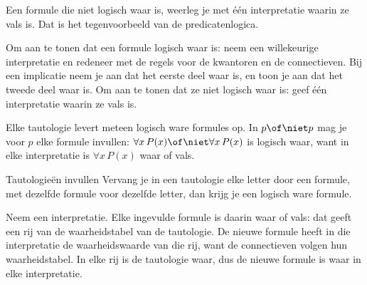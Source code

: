 Een formule die niet logisch waar is, weerleg je met één interpretatie waarin ze vals is. Dat is het tegenvoorbeeld van de predicatenlogica.


\begin{werkwijze}
Om aan te tonen dat een formule logisch waar is: neem een willekeurige interpretatie en redeneer met de regels voor de kwantoren en de connectieven. Bij een implicatie neem je aan dat het eerste deel waar is, en toon je aan dat het tweede deel waar is. Om aan te tonen dat ze niet logisch waar is: geef één interpretatie waarin ze vals is.
\end{werkwijze}

Elke tautologie levert meteen logisch ware formules op. In $p \of \niet p$ mag je voor $p$ elke formule invullen: $\forall x\, P(x) \of \niet\forall x\, P(x)$ is logisch waar, want in elke interpretatie is $\forall x\, P(x)$ waar of vals.

\begin{theorie}
\begin{stelling}{Tautologieën invullen}
Vervang je in een tautologie elke letter door een formule, met dezelfde formule voor dezelfde letter, dan krijg je een logisch ware formule.
\end{stelling}

\begin{bewijs}
Neem een interpretatie. Elke ingevulde formule is daarin waar of vals: dat geeft een rij van de waarheidstabel van de tautologie. De nieuwe formule heeft in die interpretatie de waarheidswaarde van die rij, want de connectieven volgen hun waarheidstabel. In elke rij is de tautologie waar, dus de nieuwe formule is waar in elke interpretatie.
\end{bewijs}
\end{theorie}

